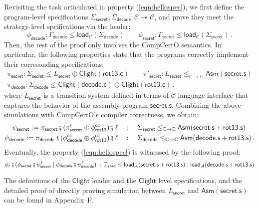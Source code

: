 \documentclass[acmsmall,screen,review,anonymous,nonacm]{acmart}
\newcommand{\kw}[1]{\ensuremath{ \mathsf{#1} }}
\begin{document}
\begin{example}
Revisiting
the task articulated in property (\ref{eqn:hellospec}),
we first
define the
program-level specifications
$\Sigma_\kw{secret}, \Sigma_\kw{decode} :
\mathcal{C} \twoheadrightarrow \mathcal{C}$,
and prove
they meet
the strategy-level spcifications
via the loader:
\[
  \phi_\kw{decode}: \Gamma_\kw{decode} \le \kw{load}_\mathcal{C}(\Sigma_\kw{decode})
  \qquad
  \phi_\kw{secret}: \Gamma_\kw{secret} \le \kw{load}_\mathcal{C}(\Sigma_\kw{secret})
  \,.
\]%
Then, the rest of the proof
only involves the CompCertO semantics.
In particular,
the following properties
state that
the programs correctly implement
their corresonding specifications:
\begin{gather*}
  \pi_\kw{secret}: \Sigma_\kw{secret} \le L_\kw{secret} \oplus \kw{Clight}(\kw{rot13.c})
  \qquad
  \pi'_\kw{secret}: L_\kw{secret} \le_{\mathbb{C} \rightarrow \mathbb{C}} \kw{Asm}(\kw{secret.s})
  \\
  \pi_\kw{decode}: \Sigma_\kw{decode} \le \kw{Clight}(\kw{decode.c}) \oplus \kw{Clight}(\kw{rot13.c})
  \,.
\end{gather*}
where $L_\kw{secret}$
is a transition system
defined in terms of $\mathcal{C}$ language interface
that captures the behavior of
the assembly program $\kw{secret.s}$.
Combining the above simulations
with CompCertO's compiler correctness,
we obtain:
\begin{align*}
   \psi_\kw{secret} := \pi_\kw{secret} \fatsemi
  (\pi'_\kw{secret} \oplus \phi^\kw{cc}_\kw{rot13})
  \fatsemi \ell
  & \quad :\quad \Sigma_\kw{secret} \le_{\mathbb{C} \rightarrow \mathbb{C}}
  \kw{Asm}(\kw{secret.s} + \kw{rot13.s}) \\
   \psi_\kw{decode} := \pi_\kw{decode} \fatsemi
  (\phi^\kw{cc}_\kw{decode} \oplus \phi^\kw{cc}_\kw{rot13})
  \fatsemi \ell
  & \quad :\quad \Sigma_\kw{decode} \le_{\mathbb{C} \rightarrow \mathbb{C}}
  \kw{Asm}(\kw{decode.s} + \kw{rot13.s})
  \,.
\end{align*}
Eventually,
the property (\ref{eqn:hellospec})
is witnessed by the following proof:
\[
 \phi_t \fatsemi
 (\phi_\kw{secret} \fatsemi \psi_\kw{secret}^\ell \mid
 \phi_\kw{decode} \fatsemi \psi_\kw{decode}^\ell) \: : \:
 \Gamma_\kw{spec} \le \kw{load}_\mathcal{A}(\kw{secret.s} + \kw{rot13.s})
 \mid \kw{load}_\mathcal{A}(\kw{decode.s} + \kw{rot13.s})
\]
\end{example}%
The definitions of
the $\kw{Clight}$ loader and
the $\kw{Clight}$ level specifications,
and the detailed proof
of directly proving simulation
between $L_\kw{secret}$ and $\kw{Asm}(\kw{secret.s})$
can be found in Appendix~F.
\end{document}

